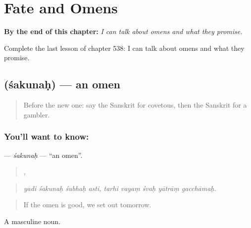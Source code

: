 
\chapter{Fate and Omens}
\label{ch:sa-fate-and-omens}

\begin{chapteropening}
\textbf{By the end of this chapter:} \emph{I can talk about omens and what they promise.}

Complete the last lesson of chapter 538: I can talk about omens and what they promise.
\end{chapteropening}

\section[\texorpdfstring{\sk{शकुनः} (śakunaḥ)}{शकुनः (śakunaḥ)}]{ (śakunaḥ) — an omen}

\label{lesson:SA-C538-sakunah}



\begin{quote}
Before the new one: say the Sanskrit for covetous, then the Sanskrit for a gambler.
\end{quote}

\subsection*{You'll want to know: }
\textbf{} — \emph{śakunaḥ} — \textquotedblleft{}an omen\textquotedblright{}.

\begin{quote}
   ,     
\end{quote}

\begin{quote}
\emph{yadi śakunaḥ śubhaḥ asti, tarhi vayaṃ śvaḥ yātrāṃ gacchāmaḥ.}
\end{quote}

\begin{quote}
If the omen is good, we set out tomorrow.
\end{quote}

A masculine noun.


